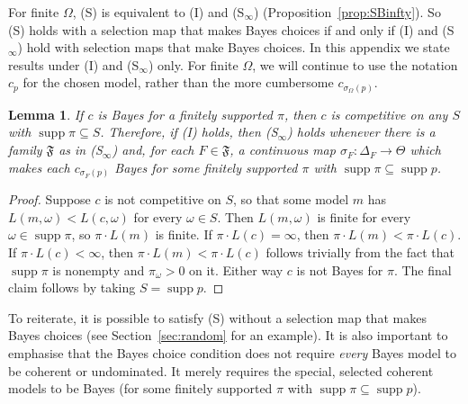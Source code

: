 \documentclass[11pt]{article}
\newtheorem{lemma}[theorem]{Lemma}
\theoremstyle{definition}
\theoremstyle{remark}
\newcommand{\F}{\mathfrak F}
\newcommand{\supp}{\operatorname{supp}}
\begin{document}
For finite $\Omega$, (S) is equivalent to (I) and (S$_\infty$) (Proposition~\ref{prop:SBinfty}). So (S) holds with a selection map that makes Bayes choices if and only if (I) and (S$_\infty$) hold with selection maps that make Bayes choices. In this appendix we state results under (I) and (S$_\infty$) only. For finite $\Omega$, we will continue to use the notation $c_p$ for the chosen model, rather than the more cumbersome $c_{\sigma_\Omega(p)}$. 


\begin{lemma}\label{lem:bayes-choice}
If $c$ is Bayes for a finitely supported $\pi$, then $c$ is competitive on any $S$ with $\supp\pi\subseteq S$. Therefore, if (I) holds, then (S$_\infty$) holds whenever there is a family $\F$ as in (S$_\infty$) and, for each $F\in\F$, a continuous map $\sigma_F:\Delta_F\to\Theta$ which makes each $c_{\sigma_F(p)}$ Bayes for some finitely supported $\pi$ with $\supp\pi\subseteq\supp p$.
\end{lemma}
\begin{proof}
Suppose $c$ is not competitive on $S$, so that some model $m$ has $L(m,\omega)<L(c,\omega)$ for every $\omega\in S$. Then $L(m,\omega)$ is finite for every $\omega\in\supp\pi$, so $\pi\cdot L(m)$ is finite. If $\pi\cdot L(c)=\infty$, then $\pi\cdot L(m)<\pi\cdot L(c)$. If $\pi\cdot L(c)<\infty$, then $\pi\cdot L(m)<\pi\cdot L(c)$ follows trivially from the fact that $\supp\pi$ is nonempty and $\pi_\omega>0$ on it. Either way $c$ is not Bayes for $\pi$. The final claim follows by taking $S=\supp p$.
\end{proof}

To reiterate, it is possible to satisfy (S) without a selection map that makes Bayes choices (see Section~\ref{sec:random} for an example). It is also important to emphasise that the Bayes choice condition does not require \emph{every} Bayes model to be coherent or undominated. It merely requires the special, selected coherent models to be Bayes (for some finitely supported $\pi$ with $\supp\pi\subseteq\supp p$). 
\end{document}
